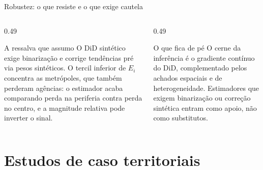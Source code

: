 \documentclass[aspectratio=169,10pt]{beamer}
\newcommand{\ex}{E_i}
\begin{document}
\begin{frame}{Robustez: o que resiste e o que exige cautela}
  \vspace{0.7em}
  \begin{columns}[T]
    \begin{column}{0.49\textwidth}
      \begin{alertblock}{A ressalva que assumo}
        \scriptsize O DiD sintético exige binarização e corrige tendências pré via
        pesos sintéticos. O tercil inferior de $\ex$ concentra as metrópoles, que
        também perderam agências: o estimador acaba comparando perda na periferia
        contra perda no centro, e a magnitude relativa pode inverter o sinal.
      \end{alertblock}
    \end{column}
    \begin{column}{0.49\textwidth}
      \begin{block}{O que fica de pé}
        \scriptsize O cerne da inferência é o gradiente contínuo do DiD,
        complementado pelos achados espaciais e de heterogeneidade. Estimadores que
        exigem binarização ou correção sintética entram como apoio, não como
        substitutos.
      \end{block}
    \end{column}
  \end{columns}
\end{frame}

\section{Estudos de caso territoriais}
\end{document}
